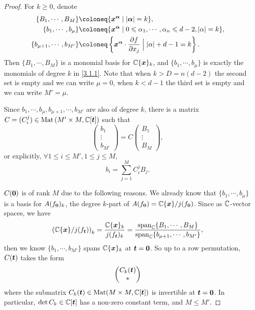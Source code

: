 \begin{proof} 
  For $k\geqslant 0$, denote
  \begin{align*}
    \{B_1,\cdots, B_M\}&\coloneq \{\xn^{\boldsymbol{\alpha}} \mid |\boldsymbol{\alpha}| = k \},\\
    \{b_1,\cdots, b_\mu\}&\coloneq \{\xn^{\boldsymbol {\alpha}} \mid 0 \leqslant \alpha_1,\cdots, \alpha_n \leqslant d-2, |\alpha|=k\},\\
    \{b_{\mu+1},\cdots, b_{M'}\}&\coloneq \left\{ \xn^{\boldsymbol \alpha}\cdot \pd f{x_j} \Bigm| |\alpha|+d-1=k \right\}.
  \end{align*}
  Then $\{B_1,\cdots, B_M\}$ is a monomial basis for ${\mathbb{C}}\{{\boldsymbol{x}}\}_k$, and $\{b_1,\cdots, b_\mu\}$ is exactly the monomials of degree $k$  in \eqref{3.1.1}. Note that when $k>D=n(d-2)$ the second set is empty and we can write $\mu=0$, when $k<d-1$ the third set is empty and we can write $M'=\mu$. 

  Since $b_1,\cdots, b_\mu, b_{\mu+1},\cdots, b_{M'}$ are also of degree $k$, there is a matrix $C=(C_i^j) \in \operatorname{Mat}\left( M' \times M , {\mathbb{C}}[{\boldsymbol t}] \right)$ such that
  \[\begin{pmatrix}
    b_1\\
    \vdots\\
    b_{M'}
  \end{pmatrix}
  =
  C
  \begin{pmatrix}
    B_1\\
    \vdots\\
    B_M
  \end{pmatrix}
,\]
or explicitly, $\forall 1\leqslant i \leqslant M', 1\leqslant j \leqslant M$, 
\[b_i=\sum_{j=1}^M C_i^j B_j.\]

$C({\boldsymbol 0})$ is of rank $M$ due to the following reasons. We already know that $\{b_1,\cdots, b_\mu\}$ is a basis for $A(f_{\boldsymbol 0})_k$, the degree $k$-part of $A(f_{\boldsymbol 0})={\mathbb{C}}\{{\boldsymbol{x}}\}/j(f_{\boldsymbol 0})$. Since as ${\mathbb{C}}$-vector spaces, we have
\[\left({\mathbb{C}}\{{\boldsymbol{x}}\}/j(f_{\boldsymbol t}) \right)_k=\frac{{\mathbb{C}}\{{\boldsymbol{x}}\}_k}{j(f_{\boldsymbol t})_k}
  =\frac{\operatorname{span}_{\mathbb{C}}\{B_1,\cdots, B_M\}}
{\operatorname{span}_{\mathbb{C}}\{b_{\mu+1},\cdots, b_{M'}\}},\]
then we know $\{b_1,\cdots, b_{M'}\}$ spans ${\mathbb{C}}\{{\boldsymbol{x}}\}_k$ at ${\boldsymbol t}={\boldsymbol 0}$.  So up to a row permutation, $C({\boldsymbol t})$ takes the form
\[\begin{pmatrix}
  C_k({\boldsymbol t})\\
  *
\end{pmatrix}\]   
where the submatrix $C_k({\boldsymbol t})\in \operatorname{Mat}(M\times M , {\mathbb{C}}[{\boldsymbol t}]) $ is invertible at ${\boldsymbol t}={\boldsymbol 0}$.  In particular, $\det C_k \in {\mathbb{C}}[{\boldsymbol t}]$ has a non-zero constant term, and $M\leqslant M'$.


\end{proof}
